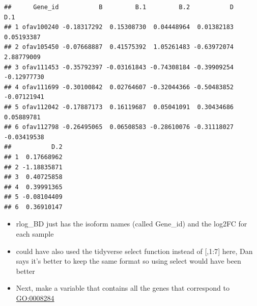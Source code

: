 \documentclass[
]{article}
\newenvironment{Shaded}{\begin{snugshade}}{\end{snugshade}}
\newcommand{\DataTypeTok}[1]{\textcolor[rgb]{0.13,0.29,0.53}{#1}}
\newcommand{\DecValTok}[1]{\textcolor[rgb]{0.00,0.00,0.81}{#1}}
\newcommand{\KeywordTok}[1]{\textcolor[rgb]{0.13,0.29,0.53}{\textbf{#1}}}
\newcommand{\NormalTok}[1]{#1}
\newcommand{\OperatorTok}[1]{\textcolor[rgb]{0.81,0.36,0.00}{\textbf{#1}}}
\newcommand{\OtherTok}[1]{\textcolor[rgb]{0.56,0.35,0.01}{#1}}
\newcommand{\StringTok}[1]{\textcolor[rgb]{0.31,0.60,0.02}{#1}}
\begin{document}
\begin{Shaded}
\end{Shaded}

\begin{verbatim}
##      Gene_id           B         B.1         B.2           D         D.1
## 1 ofav100240 -0.18317292  0.15308730  0.04448964  0.01382183  0.05193387
## 2 ofav105450 -0.07668887  0.41575392  1.05261483 -0.63972074  2.88779009
## 3 ofav111453 -0.35792397 -0.03161843 -0.74308184 -0.39909254 -0.12977730
## 4 ofav111699 -0.30100842  0.02764607 -0.32044366 -0.50483852 -0.07121941
## 5 ofav112042 -0.17887173  0.16119687  0.05041091  0.30434686  0.05889781
## 6 ofav112798 -0.26495065  0.06508583 -0.28610076 -0.31118027 -0.03419538
##           D.2
## 1  0.17668962
## 2 -1.18835871
## 3  0.40725858
## 4  0.39991365
## 5 -0.08104409
## 6  0.36910147
\end{verbatim}

\begin{itemize}
\item
  rlog\_BD just has the isoform names (called Gene\_id) and the log2FC
  for each sample
\item
  could have also used the tidyverse select function instead of
  {[},1:7{]} here, Dan says it's better to keep the same format so using
  select would have been better
\item
  Next, make a variable that contains all the genes that correspond to
  \url{GO:0008284}
\end{itemize}

\begin{Shaded}
\end{Shaded}
\end{document}
